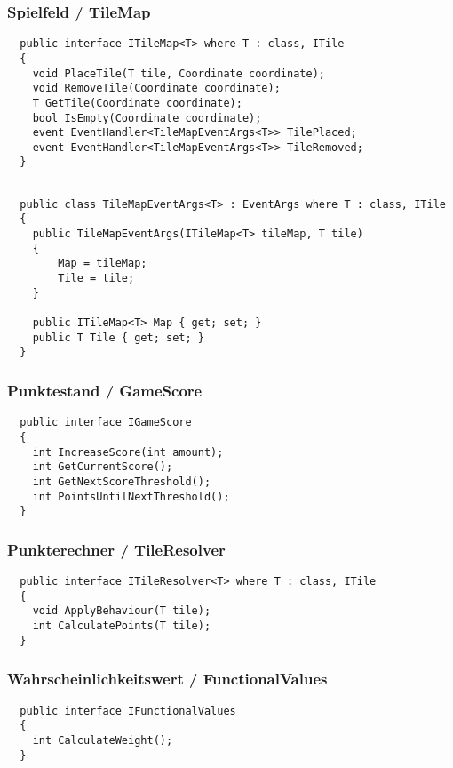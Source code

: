 \documentclass[../main.tex]{subfiles}
\begin{document}
	\subsubsection{Spielfeld / TileMap}
	\begin{lstlisting}
  public interface ITileMap<T> where T : class, ITile
  {
	void PlaceTile(T tile, Coordinate coordinate);
	void RemoveTile(Coordinate coordinate);
	T GetTile(Coordinate coordinate);
	bool IsEmpty(Coordinate coordinate);
	event EventHandler<TileMapEventArgs<T>> TilePlaced;
	event EventHandler<TileMapEventArgs<T>> TileRemoved;
  }
	

	\end{lstlisting}
	\begin{lstlisting}
  public class TileMapEventArgs<T> : EventArgs where T : class, ITile
  {
	public TileMapEventArgs(ITileMap<T> tileMap, T tile)
	{
		Map = tileMap;
		Tile = tile;
	}
	
	public ITileMap<T> Map { get; set; }
	public T Tile { get; set; }
  }
	\end{lstlisting}

	\subsubsection{Punktestand / GameScore}
	\begin{lstlisting}
  public interface IGameScore
  {
	int IncreaseScore(int amount);
	int GetCurrentScore();
	int GetNextScoreThreshold();
	int PointsUntilNextThreshold();
  }
	\end{lstlisting}

	\subsubsection{Punkterechner / TileResolver}
	\begin{lstlisting}
  public interface ITileResolver<T> where T : class, ITile
  {
	void ApplyBehaviour(T tile);
	int CalculatePoints(T tile);
  }
	\end{lstlisting}

	\subsubsection{Wahrscheinlichkeitswert / FunctionalValues}
	\begin{lstlisting}
  public interface IFunctionalValues
  {
	int CalculateWeight();
  }
	\end{lstlisting}
\end{document}
